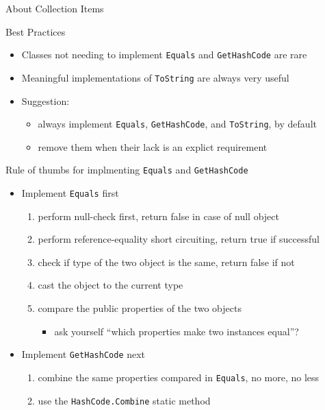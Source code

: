 \documentclass[presentation]{beamer}
\begin{document}
\begin{frame}[allowframebreaks]{About Collection Items}
  \begin{exampleblock}{Best Practices}
    \begin{itemize}
      \item Classes not needing to implement \texttt{Equals} and \texttt{GetHashCode} are rare
      \item Meaningful implementations of \texttt{ToString} are always very useful
      \item Suggestion:
      \begin{itemize}
        \item always implement \texttt{Equals}, \texttt{GetHashCode}, and \texttt{ToString}, by default
        \item remove them when their lack is an explict requirement
      \end{itemize}
    \end{itemize}
  \end{exampleblock}

  \begin{exampleblock}{Rule of thumbs for implmenting \texttt{Equals} and \texttt{GetHashCode}}
    \begin{itemize}
      \item Implement \texttt{Equals} first
      \begin{enumerate}
        \item perform null-check first, return false in case of null object
        \item perform reference-equality short circuiting, return true if successful
        \item check if type of the two object is the same, return false if not
        \item cast the object to the current type
        \item compare the public properties of the two objects
        \begin{itemize}
          \item ask yourself ``which properties make two instances equal''?
        \end{itemize}
      \end{enumerate}

      \item Implement \texttt{GetHashCode} next
      \begin{enumerate}
        \item combine the same properties compared in \texttt{Equals}, no more, no less
        \item use the \texttt{HashCode.Combine} static method
      \end{enumerate}
    \end{itemize}
  \end{exampleblock}
\end{frame}
\end{document}
